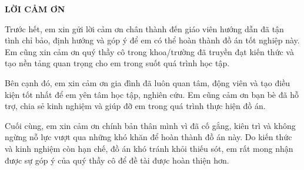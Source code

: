 \documentclass[../DoAn.tex]{subfiles}
\begin{document}
\begin{center}
    \Large{\textbf{LỜI CẢM ƠN}}\\
\end{center}
\vspace{1cm}
\hspace*{1.5cm}Trước hết, em xin gửi lời cảm ơn chân thành đến giáo viên hướng dẫn đã tận tình chỉ bảo, định hướng và góp ý để em có thể hoàn thành đồ án tốt nghiệp này. Em cũng xin cảm ơn quý thầy cô trong khoa/trường đã truyền đạt kiến thức và tạo nền tảng quan trọng cho em trong suốt quá trình học tập.

\hspace*{1.5cm}Bên cạnh đó, em xin cảm ơn gia đình đã luôn quan tâm, động viên và tạo điều kiện tốt nhất để em yên tâm học tập, nghiên cứu. Em cũng cảm ơn bạn bè đã hỗ trợ, chia sẻ kinh nghiệm và giúp đỡ em trong quá trình thực hiện đồ án.

\hspace*{1.5cm}Cuối cùng, em xin cảm ơn chính bản thân mình vì đã cố gắng, kiên trì và không ngừng nỗ lực vượt qua những khó khăn để hoàn thành đồ án này. Do kiến thức và kinh nghiệm còn hạn chế, đồ án khó tránh khỏi thiếu sót, em rất mong nhận được sự góp ý của quý thầy cô để đề tài được hoàn thiện hơn.
\end{document}
